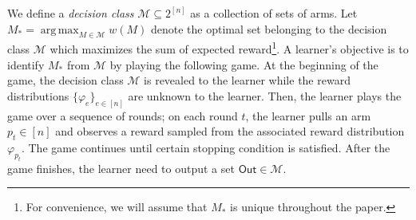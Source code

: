 \documentclass{article}
\newcommand{\Rew}{\varphi}
\newcommand{\E}{\mathbb E}
\newcommand{\M}{\mathcal M}
\DeclareMathOperator*{\argmax}{arg\,max}
\newcommand{\out}{\mathsf{Out}}
\renewcommand{\vec}[1]{\boldsymbol{#1}}
\begin{document}
We define a \emph{decision class} $\M \subseteq 2^{[n]}$ as a collection of sets of arms.
Let $M_*=\argmax_{M\in \M} w(M)$ denote the optimal set belonging to the decision class $\M$ which maximizes the sum of expected reward\footnote{For convenience, we will assume that $M_*$ is unique throughout the paper.}. 
A learner's objective is to identify $M_*$ from $\M$ by playing the following game.
At the beginning of the game, the decision class $\M$ is revealed to the learner while the reward distributions $\{\Rew_e\}_{e\in[n]}$ are unknown to the learner.
Then, the learner plays the game over a sequence of rounds;
on each round $t$, the learner pulls an arm $p_t\in [n]$ and observes a reward sampled from the associated reward distribution $\Rew_{p_t}$.
The game continues until certain stopping condition is satisfied.
After the game finishes, the learner need to output a set $\out \in \M$.



\end{document}
